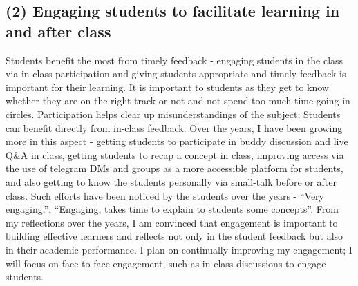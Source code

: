 \documentclass[11pt, a4paper]{article}
\begin{document}
\subsection{(2) Engaging students to facilitate learning in and after class}
Students benefit the most from timely feedback - engaging students in the class via in-class participation and giving students appropriate and timely feedback is important for their learning. It is important to students as they get to know whether they are on the right track or not and not spend too much time going in circles. Participation helps clear up misunderstandings of the subject; Students can benefit directly from in-class feedback. Over the years, I have been growing more in this aspect - getting students to participate in buddy discussion and live Q\&A in class, getting students to recap a concept in class, improving access via the use of telegram DMs and groups as a more accessible platform for students, and also getting to know the students personally via small-talk before or after class. Such efforts have been noticed by the students over the years - “Very engaging.”, “Engaging, takes time to explain to students some concepts”. From my reflections over the years, I am convinced that engagement is important to building effective learners and reflects not only in the student feedback but also in their academic performance. I plan on continually improving my engagement; I will focus on face-to-face engagement, such as in-class discussions to engage students.
\end{document}
